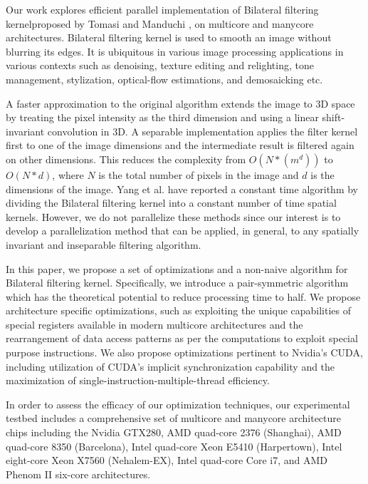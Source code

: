 \documentclass{IEEEtran}
\begin{document}
Our work explores efficient parallel implementation of Bilateral filtering kernel\footnotemark[1] proposed by Tomasi and Manduchi \cite{Tomasi1998}, on multicore and manycore architectures. Bilateral filtering kernel is used to smooth an image without blurring its edges. It is ubiquitous in various image processing applications in various contexts such as denoising\cite{zhang2008}, texture editing and relighting\cite{eisemann2004}, tone management\cite{Bae2006}, stylization\cite{DeCarlo2002}, optical-flow estimations\cite{Xiao2006}, and demosaicking\cite{Ramanath2003} etc. 

A faster approximation to the original algorithm \cite{Paris2009} extends the image to 3D space by treating the pixel intensity as the third dimension and using a linear shift-invariant convolution in 3D. A separable implementation \cite{Pham2005} applies the filter kernel first to one of the image dimensions and the intermediate result is filtered again on other dimensions. This reduces the complexity from $O(N*(m^{d}))$ to $O(N*d)$, where $N$ is the total number of pixels in the image and $d$ is the dimensions of the image. Yang et al.\cite{yang2009} have reported a constant time algorithm by dividing the Bilateral filtering kernel into a constant number of time spatial kernels. However, we do not parallelize these methods since our interest is to develop a parallelization method that can be applied, in general, to any spatially invariant and inseparable filtering algorithm. 

In this paper, we propose a set of optimizations and a non-naive algorithm for Bilateral filtering kernel. Specifically, we introduce a pair-symmetric algorithm which has the theoretical potential to reduce processing time to half. We propose architecture specific optimizations, such as exploiting the unique capabilities of special registers available in modern multicore architectures and the rearrangement of data access patterns as per the computations to exploit special purpose instructions. We also propose optimizations pertinent to Nvidia's CUDA, including utilization of CUDA's implicit synchronization capability and the maximization of single-instruction-multiple-thread efficiency. 

In order to assess the efficacy of our optimization techniques, our experimental testbed includes a comprehensive set of multicore and manycore architecture chips including the Nvidia GTX280, AMD quad-core 2376 (Shanghai), AMD quad-core 8350 (Barcelona), Intel quad-core Xeon E5410 (Harpertown), Intel eight-core Xeon X7560 (Nehalem-EX), Intel quad-core Core i7, and AMD Phenom II six-core architectures. 
\end{document}
